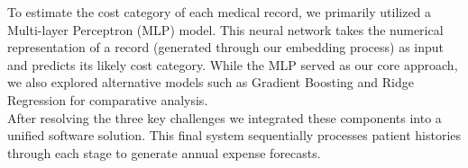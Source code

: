 To estimate the cost category of each medical record, we primarily utilized a Multi-layer Perceptron (MLP) model. This neural network takes the numerical representation of a record (generated through our embedding process) as input and predicts its likely cost category. While the MLP served as our core approach, we also explored alternative models such as Gradient Boosting and Ridge Regression for comparative analysis.
\\

After resolving the three key challenges we integrated these components into a unified software solution. This final system sequentially processes patient histories through each stage to generate annual expense forecasts.
